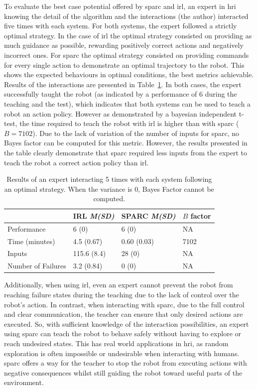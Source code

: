 To evaluate the best case potential offered by \gls{sparc} and \gls{irl}, an expert in \gls{hri} knowing the detail of the algorithm and the interactions (the author) interacted five times with each system. For both systems, the expert followed a strictly optimal strategy. In the case of \gls{irl} the optimal strategy consisted on providing as much guidance as possible, rewarding positively correct actions and negatively incorrect ones. For \gls{sparc} the optimal strategy consisted on providing commands for every single action to demonstrate an optimal trajectory to the robot. This shows the expected behaviours in optimal conditions, the best metrics achievable. Results of the interactions are presented in Table~\ref{tab:control_expert}. In both cases, the expert successfully taught the robot (as indicated by a performance of 6 during the teaching and the test), which indicates that both systems can be used to teach a robot an action policy. However as demonstrated by a bayesian independent t-test, the time required to teach the robot with \gls{irl} is higher than with \gls{sparc} ($B=7102$). Due to the lack of variation of the number of inputs for \gls{sparc}, no Bayes factor can be computed for this metric. However, the results presented in the table clearly demonstrate that \gls{sparc} required less inputs from the expert to teach the robot a correct action policy than \gls{irl}.

\begin{table}[ht]
	\centering
	\caption{Results of an expert interacting 5 times with each system following an optimal strategy. When the variance is 0, Bayes Factor cannot be computed.}
	\label{tab:control_expert}
	\begin{tabular}{@{}llll@{}}\toprule
		&IRL \textit{M(SD)} & SPARC \textit{M(SD)} & $B$ factor\\
		\midrule
		Performance & 6 (0) & 6 (0) & NA \\
		Time (minutes) & 4.5 (0.67) & 0.60 (0.03) & 7102 \\
		Inputs & 115.6 (8.4) & 28 (0) & NA \\
		Number of Failures & 3.2 (0.84) & 0 (0) & NA \\
		\bottomrule
	\end{tabular}
\end{table}

Additionally, when using \gls{irl}, even an expert cannot prevent the robot from reaching failure states during the teaching due to the lack of control over the robot's action. In contrast, when interacting with \gls{sparc}, due to the full control and clear communication, the teacher can ensure that only desired actions are executed. So, with sufficient knowledge of the interaction possibilities, an expert using \gls{sparc} can teach the robot to behave safely without having to explore or reach undesired states. This has real world applications in \gls{hri}, as random exploration is often impossible or undesirable when interacting with humans. \gls{sparc} offers a way for the teacher to stop the robot from executing actions with negative consequences whilst still guiding the robot toward useful parts of the environment.

